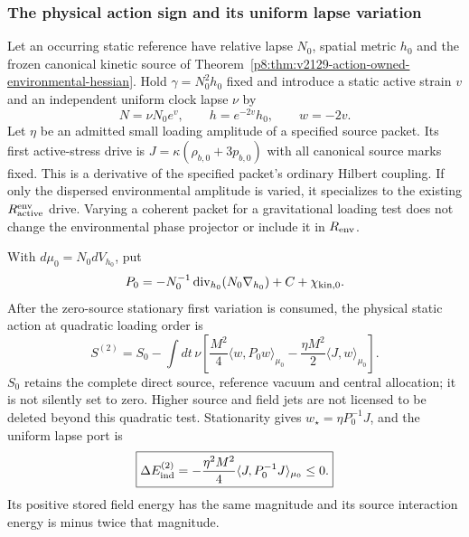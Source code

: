 \documentclass[12pt,a4paper]{article}
\begin{document}
\subsubsection{The physical action sign and its uniform lapse variation}
\begin{theorem}
\label{p8:thm:v2206-physical-static-loading}
Let an occurring static reference have relative lapse $N_0$, spatial
metric $h_0$ and the frozen canonical kinetic source of
Theorem~\ref{p8:thm:v2129-action-owned-environmental-hessian}.
Hold $\gamma=N_0^2h_0$ fixed and introduce a static active strain $v$ and
an independent uniform clock lapse $\nu$ by
\[
 N=\nu N_0e^v,\qquad h=e^{-2v}h_0,\qquad w=-2v.
\]
Let $\eta$ be an admitted small loading amplitude of a specified source
packet. Its first active-stress drive is
$J=\kappa(\rho_{b,0}+3p_{b,0})$ with all canonical source marks fixed.
This is a derivative of the specified packet's ordinary Hilbert coupling.
If only the dispersed environmental amplitude is varied, it specializes
to the existing $R_{\rm active}^{\rm env}$ drive. Varying a coherent
packet for a gravitational loading test does not change the environmental
phase projector or include it in $R_{\rm env}$.

With $d\mu_0=N_0dV_{h_0}$, put
\[
 P_0=-N_0^{-1}\operatorname{div}_{h_0}(N_0\nabla_{h_0})
          +C+\chi_{{\rm kin},0}.
\]
After the zero-source stationary first variation is consumed, the physical
static action at quadratic loading order is
\begin{equation}
\label{p8:eq:v2206-physical-static-loading}
 S^{(2)}=S_0-\int dt\,\nu\left[
 \frac{M^2}{4}\langle w,P_0w\rangle_{\mu_0}
 -\frac{\eta M^2}{2}\langle J,w\rangle_{\mu_0}\right].
\end{equation}
$S_0$ retains the complete direct source, reference vacuum and central
allocation; it is not silently set to zero. Higher source and field jets
are not licensed to be deleted beyond this quadratic test.
Stationarity gives $w_\star=\eta P_0^{-1}J$, and the uniform lapse port is
\begin{equation}
\label{p8:eq:v2206-static-induced-energy}
 \boxed{\Delta E_{\rm ind}^{(2)}
 =-\frac{\eta^2M^2}{4}\langle J,P_0^{-1}J\rangle_{\mu_0}\le0.}
\end{equation}
Its positive stored field energy has the same magnitude and its source
interaction energy is minus twice that magnitude.
\end{theorem}
\end{document}
